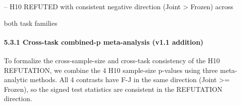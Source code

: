 \documentclass[
]{article}
\begin{document}
-- H10 REFUTED with consistent negative direction (Joint \textgreater{}
Frozen) across

both task families

\paragraph{5.3.1 Cross-task combined-p meta-analysis (v1.1
addition)}\label{cross-task-combined-p-meta-analysis-v1.1-addition}

To formalize the cross-sample-size and cross-task consistency of the H10
REFUTATION, we combine the 4 H10 sample-size p-values using three
meta-analytic methods. All 4 contrasts have F-J in the same direction
(Joint \textgreater= Frozen), so the signed test statistics are
consistent in the REFUTATION direction.
\end{document}

